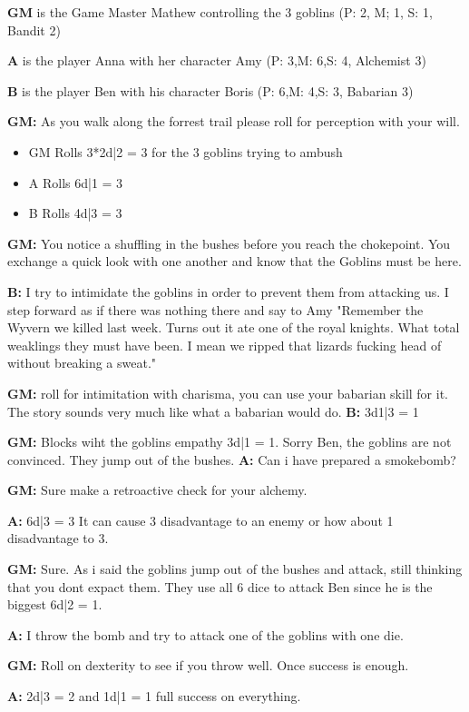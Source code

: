 \documentclass[11pt]{article}
\begin{document}
{\begin{multicols}{2}[]
\textbf{GM} is the Game Master Mathew controlling the 3 goblins (P: 2, M; 1, S: 1, Bandit 2)

\textbf{A} is the player Anna with her character Amy (P: 3,M: 6,S: 4, Alchemist 3)

\textbf{B} is the player Ben with his character Boris (P: 6,M: 4,S: 3, Babarian 3)

\textbf{GM:} As you walk along the forrest trail please roll for perception with your will.
\begin{itemize}
\item GM Rolls 3*2d|2 = 3 for the 3 goblins trying to ambush
\item A Rolls 6d|1 =  3
\item B Rolls 4d|3 =  3
\end{itemize}

\textbf{GM:} You notice a shuffling in the bushes before you reach the chokepoint. You exchange a quick look with one another and know that the Goblins must be here. 

\textbf{B:} I try to intimidate the goblins in order to prevent them from attacking us. I step forward as if there was nothing there and say to Amy "Remember the Wyvern we killed last week. Turns out it ate one of the royal knights. What total weaklings they must have been. I mean we ripped that lizards fucking head of without breaking a sweat."

\textbf{GM:} roll for intimitation with charisma, you can use your babarian skill for it. The story sounds very much like what a babarian would do.
\textbf{B:} 3d1|3 = 1

\textbf{GM:} Blocks wiht the goblins empathy 3d|1 = 1. Sorry Ben, the goblins are not convinced. They jump out of the bushes.
\textbf{A:} Can i have prepared a smokebomb?

\textbf{GM:} Sure make a retroactive check for your alchemy.

\textbf{A:} 6d|3 = 3 It can cause 3 disadvantage to an enemy or how about 1 disadvantage to 3.

\textbf{GM:} Sure. As i said the goblins jump out of the bushes and attack, still thinking that you dont expact them. They use all 6 dice to attack Ben since he is the biggest 6d|2 = 1.

\textbf{A:} I throw the bomb and try to attack one of the goblins with one die.

\textbf{GM:} Roll on dexterity to see if you throw well. Once success is enough.

\textbf{A:} 2d|3 = 2 and 1d|1 = 1 full success on everything. 


\end{multicols}}
\end{document}
